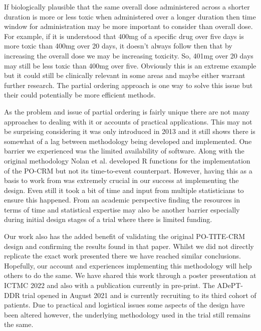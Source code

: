 If biologically plausible that the same overall dose administered across a shorter duration is more or less toxic when administered over a longer duration then time window for administration may be more important to consider than overall dose. For example, if it is understood that 400mg of a specific drug over five days is more toxic than 400mg over 20 days, it doesn't always follow then that by increasing the overall dose we may be increasing toxicity. So, 401mg over 20 days may still be less toxic than 400mg over five. Obviously this is an extreme example but it could still be clinically relevant in some areas and maybe either warrant further research. The partial ordering approach is one way to solve this issue but their could potentially be more efficient methods.  

As the problem and issue of partial ordering is fairly unique there are not many approaches to dealing with it or accounts of practical applications. This may not be surprising considering it was only introduced in 2013 and it still shows there is somewhat of a lag between methodology being developed and implemented. One barrier we experienced was the limited availability of software. Along with the original methodology Nolan et al. \cite{wagesPocrmRpackagePhase2013, wagesPocrmDoseFinding2019} developed R functions for the implementation of the PO-CRM but not its time-to-event counterpart. However, having this as a basis to work from was extremely crucial in our success at implementing the design. Even still it took a bit of time and input from multiple statisticians to ensure this happened. From an academic perspective finding the resources in terms of time and statistical expertise may also be another barrier especially during initial design stages of a trial where there is limited funding. 

Our work also has the added benefit of validating the original PO-TITE-CRM design and confirming the results found in that paper. Whilst we did not directly replicate the exact work presented there we have reached similar conclusions. Hopefully, our account and experiences implementing this methodology will help others to do the same. We have shared this work through a poster presentation at ICTMC 2022 and also with a publication currently in pre-print. The ADePT-DDR trial opened in August 2021 and is currently recruiting to its third cohort of patients. Due to practical and logistical issues some aspects of the design have been altered however, the underlying methodology used in the trial still remains the same. 

